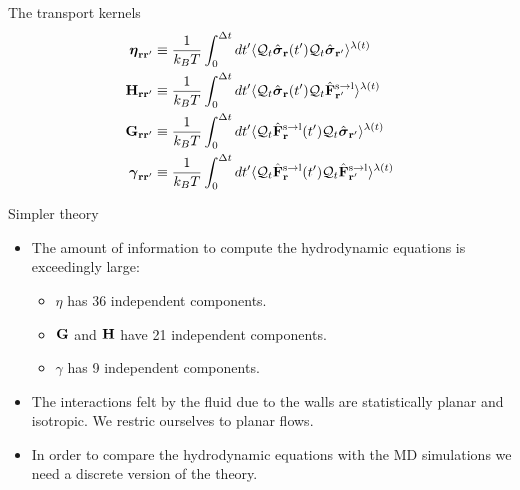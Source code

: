 \documentclass{beamer}
\begin{document}
\begin{frame}{The transport kernels}
\begin{align}
  \boldsymbol{\eta}_{{\bf  r}{\bf r}'} &\equiv
\frac{1}{k_BT}\int_0^{\Delta t} dt'\langle 
{\cal Q}_t\hat{\boldsymbol{\sigma}}_{{\bf r}}(t')
{\cal Q}_t\hat{\boldsymbol{\sigma}}_{{\bf r}'}\rangle^{\lambda(t)}
\nonumber \\
{\bf H}_{{\bf r}{\bf r}'}&\equiv\frac{1}{k_BT}\int_0^{\Delta t} dt'
\langle {\cal Q}_t\hat{\boldsymbol{\sigma}}_{{\bf r}}(t')
{\cal Q}_t\hat{\bf F}^{\rm s\to l}_{{\bf r}'}\rangle^{\lambda(t)}
\nonumber\\
{\bf G}_{{\bf r}{\bf r}'}&\equiv\frac{1}{k_BT}\int_0^{\Delta t} dt'
\langle {\cal Q}_t\hat{\bf F}^{\rm s\to l}_{{\bf r}}(t')
{\cal Q}_t\hat{\boldsymbol{\sigma}}_{{\bf r}'}\rangle^{\lambda(t)}
\nonumber\\
\boldsymbol{\gamma}_{{\bf  r}{\bf r}'}&\equiv\frac{1}{k_BT}\int_0^{\Delta t} dt'
\langle 
{\cal Q}_t\hat{\bf F}^{\rm s\to l}_{{\bf r}}(t')
{\cal Q}_t\hat{\bf F}^{\rm s\to l}_{{\bf r}'}\rangle^{\lambda(t)}
\nonumber
\end{align}
\end{frame}

\begin{frame}{Simpler theory}
  \begin{itemize}
    \item The amount of information to compute the hydrodynamic equations is exceedingly large:
      \begin{itemize}
        \item $\eta$ has 36 independent components. 
        \item ${\bf G}$ and ${\bf H}$ have 21 independent components. 
        \item $\gamma$ has 9 independent components. 
      \end{itemize}
    \item  The interactions felt by the fluid due to the walls are statistically planar and isotropic. We restric ourselves to planar flows. 
    \item In order to compare the hydrodynamic equations with the MD simulations we need a discrete version of the theory. 
    \end{itemize}
\end{frame}
\end{document}

